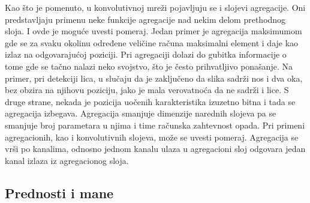 \par 
Kao što je pomenuto, u konvolutivnoj mreži pojavljuju se i slojevi agregacije. Oni predstavljaju primenu neke funkcije agregacije nad nekim delom prethodnog sloja. I ovde je moguće uvesti pomeraj.  Jedan primer je agregacija maksimumom gde se za svaku okolinu određene veličine računa maksimalni element i daje kao izlaz na odgovarajućoj poziciji.  Pri agregaciji dolazi do gubitka informacije o tome gde se tačno nalazi neko svojstvo, što je često prihvatljivo ponašanje. Na primer, pri detekciji lica, u slučaju da je zaključeno da slika sadrži nos i dva oka, bez obzira na njihovu poziciju, jako je mala verovatnoća da ne sadrži i lice. S druge strane, nekada je pozicija uočenih karakteristika izuzetno bitna i tada se agregacija izbegava. Agregacija smanjuje dimenzije narednih slojeva pa se smanjuje broj parametara u njima i time računska zahtevnost opada. Pri primeni agregacionih, kao i konvolutivnih slojeva, može se uvesti pomeraj. Agregacija se vrši po kanalima, odnosno jednom kanalu ulaza u agregacioni sloj odgovara jedan kanal izlaza iz agregacionog sloja. 

\subsection{Prednosti i mane}


